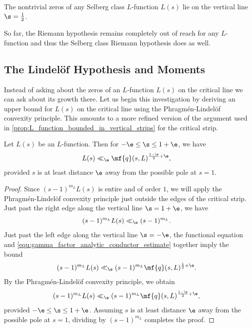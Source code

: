\documentclass[12pt]{article}
\begin{document}
      \begin{conjecture*}
        The nontrivial zeros of any Selberg class \(L\)-function \(L(s)\) lie on the vertical line \(\s = \frac{1}{2}\).
      \end{conjecture*}

      So far, the Riemann hypothesis remains completely out of reach for any \(L\)-function and thus the Selberg class Riemann hypothesis does as well.
    \subsection{The Lindel\"of Hypothesis and Moments}
      Instead of asking about the zeros of an \(L\)-function \(L(s)\) on the critical line we can ask about its growth there. Let us begin this investigation by deriving an upper bound for \(L(s)\) on the critical line using the Phragm\'en-Lindel\"of convexity principle. This amounts to a more refined version of the argument used in \cref{prop:L_function_bounded_in_vertical_strips} for the critical strip.

      \begin{theorem}\label{thm:convexity_bound_for_L_function_in_critial_strip}
        Let \(L(s)\) be an \(L\)-function. Then for \(-\e \le \s \le 1+\e\), we have
        \[
          L(s) \ll_{\e} \mf{q}(s,L)^{\frac{1-\s}{2}+\e},
        \]
        provided \(s\) is at least distance \(\e\) away from the possible pole at \(s = 1\).
      \end{theorem}
      \begin{proof}
        Since \((s-1)^{m_{L}}L(s)\) is entire and of order \(1\), we will apply the Phragm\'en-Lindel\"of convexity principle just outside the edges of the critical strip. Just past the right edge along the vertical line \(\s = 1+\e\), we have
        \[
          (s-1)^{m_{L}}L(s) \ll_{\e} (s-1)^{m_{L}}.
        \]
        Just past the left edge along the vertical line \(\s = -\e\), the functional equation and \cref{equ:gamma_factor_analytic_conductor_estimate} together imply the bound
        \[
          (s-1)^{m_{L}}L(s) \ll_{\e} (s-1)^{m_{L}}\mf{q}(s,L)^{\frac{1}{2}+\e}.
        \]
        By the Phragm\'en-Lindel\"of convexity principle, we obtain
        \[
          (s-1)^{m_{L}}L(s) \ll_{\e} (s-1)^{m_{L}}\mf{q}(s,L)^{\frac{1-\s}{2}+\e},
        \]
        provided \(-\e \le \s \le 1+\e\). Assuming \(s\) is at least distance \(\e\) away from the possible pole at \(s = 1\), dividing by \((s-1)^{m_{L}}\) completes the proof.
      \end{proof}
      
\end{document}
